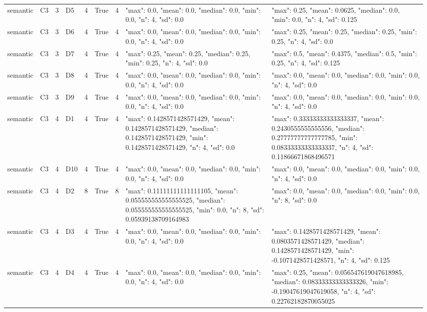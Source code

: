 \begin{tabular}{lllllllll}
semantic & C3 & 3 & D5 & 4 & True & 4 & {"max": 0.0, "mean": 0.0, "median": 0.0, "min": 0.0, "n": 4, "sd": 0.0} & {"max": 0.25, "mean": 0.0625, "median": 0.0, "min": 0.0, "n": 4, "sd": 0.125} \\
semantic & C3 & 3 & D6 & 4 & True & 4 & {"max": 0.0, "mean": 0.0, "median": 0.0, "min": 0.0, "n": 4, "sd": 0.0} & {"max": 0.25, "mean": 0.25, "median": 0.25, "min": 0.25, "n": 4, "sd": 0.0} \\
semantic & C3 & 3 & D7 & 4 & True & 4 & {"max": 0.25, "mean": 0.25, "median": 0.25, "min": 0.25, "n": 4, "sd": 0.0} & {"max": 0.5, "mean": 0.4375, "median": 0.5, "min": 0.25, "n": 4, "sd": 0.125} \\
semantic & C3 & 3 & D8 & 4 & True & 4 & {"max": 0.0, "mean": 0.0, "median": 0.0, "min": 0.0, "n": 4, "sd": 0.0} & {"max": 0.0, "mean": 0.0, "median": 0.0, "min": 0.0, "n": 4, "sd": 0.0} \\
semantic & C3 & 3 & D9 & 4 & True & 4 & {"max": 0.0, "mean": 0.0, "median": 0.0, "min": 0.0, "n": 4, "sd": 0.0} & {"max": 0.0, "mean": 0.0, "median": 0.0, "min": 0.0, "n": 4, "sd": 0.0} \\
semantic & C3 & 4 & D1 & 4 & True & 4 & {"max": 0.1428571428571429, "mean": 0.1428571428571429, "median": 0.1428571428571429, "min": 0.1428571428571429, "n": 4, "sd": 0.0} & {"max": 0.33333333333333337, "mean": 0.2430555555555556, "median": 0.27777777777777785, "min": 0.08333333333333337, "n": 4, "sd": 0.11866671868496571} \\
semantic & C3 & 4 & D10 & 4 & True & 4 & {"max": 0.0, "mean": 0.0, "median": 0.0, "min": 0.0, "n": 4, "sd": 0.0} & {"max": 0.0, "mean": 0.0, "median": 0.0, "min": 0.0, "n": 4, "sd": 0.0} \\
semantic & C3 & 4 & D2 & 8 & True & 8 & {"max": 0.11111111111111105, "mean": 0.055555555555555525, "median": 0.055555555555555525, "min": 0.0, "n": 8, "sd": 0.05939138709164983} & {"max": 0.0, "mean": 0.0, "median": 0.0, "min": 0.0, "n": 8, "sd": 0.0} \\
semantic & C3 & 4 & D3 & 4 & True & 4 & {"max": 0.0, "mean": 0.0, "median": 0.0, "min": 0.0, "n": 4, "sd": 0.0} & {"max": 0.1428571428571429, "mean": 0.0803571428571429, "median": 0.1428571428571429, "min": -0.1071428571428571, "n": 4, "sd": 0.125} \\
semantic & C3 & 4 & D4 & 4 & True & 4 & {"max": 0.0, "mean": 0.0, "median": 0.0, "min": 0.0, "n": 4, "sd": 0.0} & {"max": 0.25, "mean": 0.056547619047618985, "median": 0.08333333333333326, "min": -0.19047619047619058, "n": 4, "sd": 0.22762182870055025} \\

\end{tabular}
